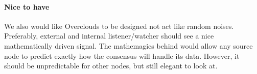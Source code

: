 \paragraph{Nice to have} We also would like Overclouds to be designed not act like random noises. Preferably, external and internal listener/watcher should see a nice mathematically driven signal. The mathemagics behind would allow any source node to predict exactly how the consensus will handle its data. However, it should be unpredictable for other nodes, but still elegant to look at.

